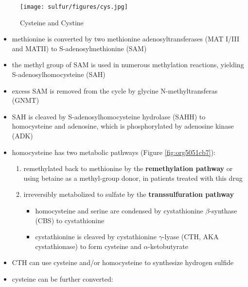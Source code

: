 \documentclass[12pt]{scrartcl}
\begin{document}
\begin{center}
\begin{center}
\begin{center}
\chemnameinit{}
\chemnameinit{}
\hspace{20}
\chemnameinit{}
\hspace{20}
\end{center}


\begin{figure}[htbp]
\centering
\texttt{[image: sulfur/figures/cys.jpg]}
\caption{\label{fig:orge9d1c1d}Cysteine and Cystine}
\end{figure}

\begin{itemize}
\item methionine is converted by two methionine adenosyltransferases (MAT
I/III and MATII) to S-adenosylmethionine (SAM)
\item the methyl group of SAM is used in numerous methylation reactions,
yielding S-adenosylhomocysteine (SAH)
\item excess SAM is removed from the cycle by glycine N-methyltransferas (GNMT)
\item SAH is cleaved by S-adenosylhomocysteine hydrolase (SAHH) to
homocysteine and adenosine, which is phosphorylated by adenosine
kinase (ADK)
\item homocysteine has two metabolic pathways (Figure \ref{fig:org5051cb7}):
\begin{enumerate}
\item remethylated back to methionine by the \textbf{remethylation pathway} or
using betaine as a methyl-group donor, in patients treated with
this drug
\item irreversibly metabolized to sulfate
by the \textbf{transsulfuration pathway}
\begin{itemize}
\item homocysteine and serine are condensed by cystathionine
\(\beta\)-synthase (CBS) to cystathionine
\item cystathionine is cleaved by cystathionine \(\gamma\)-lyase (CTH, AKA cystathionase) to
form cysteine and \(\alpha\)-ketobutyrate
\end{itemize}
\end{enumerate}
\item CTH can use cysteine and/or homocysteine to synthesize hydrogen
sulfide
\item cysteine can be further converted:

\end{itemize}
\end{center}
\end{center}
\end{document}
